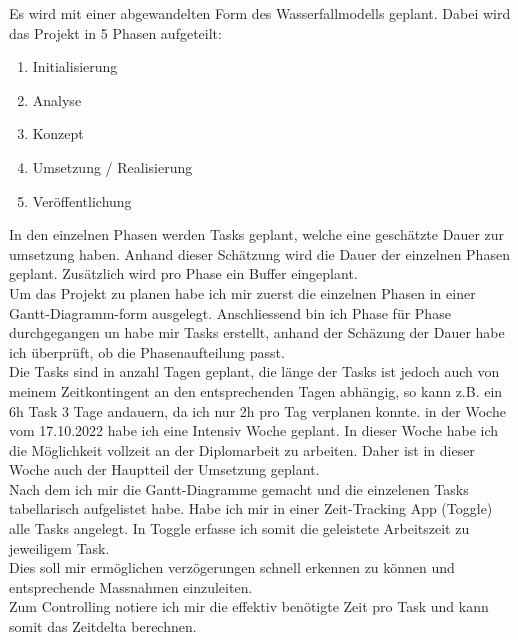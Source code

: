 Es wird mit einer abgewandelten Form des Wasserfallmodells geplant.
Dabei wird das Projekt in 5 Phasen aufgeteilt: \\
\begin{enumerate}
  \item Initialisierung
  \item Analyse
  \item Konzept
  \item Umsetzung / Realisierung
  \item Veröffentlichung
\end{enumerate}
\vspace{1cm}
In den einzelnen Phasen werden Tasks geplant, welche eine geschätzte Dauer zur umsetzung haben.
Anhand dieser Schätzung wird die Dauer der einzelnen Phasen geplant. Zusätzlich wird pro Phase ein Buffer eingeplant.
\vspace{0.5cm}\\
Um das Projekt zu planen habe ich mir zuerst die einzelnen Phasen in einer Gantt-Diagramm-form ausgelegt.
Anschliessend bin ich Phase für Phase durchgegangen un habe mir Tasks erstellt, anhand der Schäzung der Dauer habe ich überprüft,
ob die Phasenaufteilung passt.\\
Die Tasks sind in anzahl Tagen geplant, die länge der Tasks ist jedoch auch von meinem Zeitkontingent an den entsprechenden Tagen abhängig,
so kann z.B. ein 6h Task 3 Tage andauern, da ich nur 2h pro Tag verplanen konnte.
in der Woche vom 17.10.2022 habe ich eine Intensiv Woche geplant. In dieser Woche habe ich die Möglichkeit vollzeit an der Diplomarbeit zu arbeiten.
Daher ist in dieser Woche auch der Hauptteil der Umsetzung geplant.\\
Nach dem ich mir die Gantt-Diagramme gemacht und die einzelenen Tasks tabellarisch aufgelistet habe. 
Habe ich mir in einer Zeit-Tracking App (Toggle) alle Tasks angelegt. In Toggle erfasse ich somit die geleistete Arbeitszeit zu jeweiligem Task.\\
Dies soll mir ermöglichen verzögerungen schnell erkennen zu können und entsprechende Massnahmen einzuleiten.\\
Zum Controlling notiere ich mir die effektiv benötigte Zeit pro Task und kann somit das Zeitdelta berechnen.
\newpage
